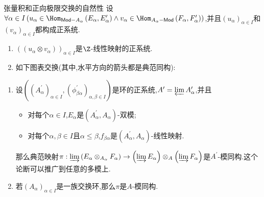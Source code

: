 \begin{corollary}{张量积和正向极限交换的自然性}{}
	设$\forall\alpha\in I\left(u_{\alpha}\in\Hom_{\mathsf{Mod}-A_{\alpha}}\left(E_{\alpha},E_{\alpha}^{\prime}\right)\wedge v_{\alpha}\in\Hom_{A_{\alpha}-\mathsf{Mod}}\left(F_{\alpha},F_{\alpha}^{\prime}\right)\right)$,并且$\left(u_{\alpha}\right)_{\alpha\in I}$和$\left(v_{\alpha}\right)_{\alpha\in I}$都构成正系统.
	\begin{enumerate}
		\item $\left(\left(u_{\alpha}\otimes v_{\alpha}\right)\right)_{\alpha\in I}$是$\Z$-线性映射的正系统.
		\item 如下图表交换(其中,水平方向的箭头都是典范同构):
		\begin{center}
		\end{center}
	\end{enumerate}
\end{corollary}

\begin{remark}{}{}
	\begin{enumerate}
		\item 设$\left(\left(A_{\alpha}^{\prime}\right)_{\alpha\in I},\left(\phi_{\beta\alpha}^{\prime}\right)_{\alpha,\beta\in I}\right)$是环的正系统,$A^{\prime}=\varprojlim A_{\alpha}^{\prime}$,并且
		\begin{itemize}
			\item 对每个$\alpha\in I$,$E_{\alpha}$是$\left(A_{\alpha}^{\prime},A_{\alpha}\right)$-双模;
			\item 对每个$\alpha,\beta\in I$且$\alpha\leq\beta$,$f_{\beta\alpha}$是$\left(A_{\alpha}^{\prime},A_{\alpha}\right)$-线性映射.
		\end{itemize}
		那么典范映射$\pi:\varinjlim\left(E_{\alpha}\otimes_{A_{\alpha}}F_{\alpha}\right)\to\left(\varinjlim E_{\alpha}\right)\otimes_{A}\left(\varinjlim F_{\alpha}\right)$是$A^{\prime}$-模同构.这个论断可以推广到任意的多模上.
		\item 若$\left(A_{\alpha}\right)_{\alpha\in I}$是一族交换环,那么$\pi$是$A$-模同构.
	\end{enumerate}
\end{remark}

